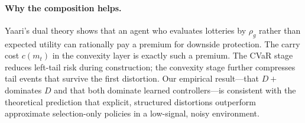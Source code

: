 \documentclass[11pt]{article}
\begin{document}
\paragraph{Why the composition helps.}
Yaari's dual theory \cite{yaari1987} shows that an agent who evaluates
lotteries by $\rho_g$ rather than expected utility can rationally pay a
premium for downside protection. The carry cost $c(m_t)$ in the convexity
layer is exactly such a premium. The CVaR stage reduces left-tail risk
during construction; the convexity stage further compresses tail events
that survive the first distortion. Our empirical result---that $D+$
dominates $D$ and that both dominate learned controllers---is consistent
with the theoretical prediction that explicit, structured distortions
outperform approximate selection-only policies in a low-signal, noisy
environment.
\end{document}
